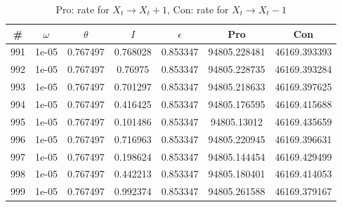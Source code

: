 \newpage
\begin{table}
\caption{Pro: rate for $X_t \rightarrow X_t + 1$, Con: rate for $X_t \rightarrow X_t - 1$}
\begin{tabular*}{\linewidth}{c|c|c|c|c|c|c}
\# & $\omega$ & $\theta$ & $I$ & $\epsilon$ & Pro & Con \\
\hline
991 & 1e-05 & 0.767497 & 0.768028 & 0.853347 & 94805.228481 & 46169.393393\\
992 & 1e-05 & 0.767497 & 0.76975 & 0.853347 & 94805.228735 & 46169.393284\\
993 & 1e-05 & 0.767497 & 0.701297 & 0.853347 & 94805.218633 & 46169.397625\\
994 & 1e-05 & 0.767497 & 0.416425 & 0.853347 & 94805.176595 & 46169.415688\\
995 & 1e-05 & 0.767497 & 0.101486 & 0.853347 & 94805.13012 & 46169.435659\\
996 & 1e-05 & 0.767497 & 0.716963 & 0.853347 & 94805.220945 & 46169.396631\\
997 & 1e-05 & 0.767497 & 0.198624 & 0.853347 & 94805.144454 & 46169.429499\\
998 & 1e-05 & 0.767497 & 0.442213 & 0.853347 & 94805.180401 & 46169.414053\\
999 & 1e-05 & 0.767497 & 0.992374 & 0.853347 & 94805.261588 & 46169.379167\\
\end{tabular*}
\end{table}